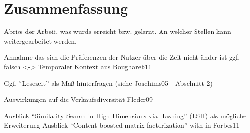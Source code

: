 
\section{Zusammenfassung}

	Abriss der Arbeit, was wurde erreicht bzw. gelernt. An welcher Stellen kann weitergearbeitet werden. 


Annahme das sich die Präferenzen der Nutzer über die Zeit nicht änder ist ggf. falsch <-> Temporaler Kontext aus Boughareb11 

Ggf. ``Lesezeit'' als Maß hinterfragen (siehe Joachims05 - Abschnitt 2)

Auswirkungen auf die Verkaufsdiversität Fleder09

Ausblick ``Similarity Search in High Dimensions via Hashing'' (LSH) als mögliche Erweiterung
Ausblick ``Content boosted matrix factorization'' with in Forbes11
